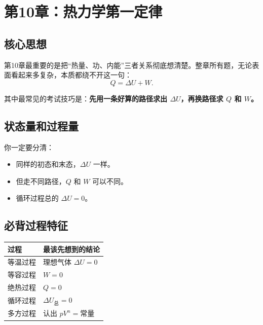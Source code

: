 \documentclass[12pt,a4paper]{article}
\newcommand{\key}[1]{\textcolor{blue!60!black}{\textbf{#1}}}
\begin{document}
\section{第10章：热力学第一定律}

\subsection{核心思想}

第10章最重要的是把“热量、功、内能”三者关系彻底想清楚。整章所有题，无论表面看起来多复杂，本质都绕不开这一句：
\[
Q=\Delta U + W.
\]

其中最常见的考试技巧是：\key{先用一条好算的路径求出 $\Delta U$，再换路径求 $Q$ 和 $W$。}

\subsection{状态量和过程量}

\begin{center}
\end{center}

你一定要分清：

\begin{itemize}
  \item 同样的初态和末态，$\Delta U$ 一样。
  \item 但走不同路径，$Q$ 和 $W$ 可以不同。
  \item 循环过程总的 $\Delta U = 0$。
\end{itemize}

\subsection{必背过程特征}

\begin{tabularx}{\textwidth}{>{\raggedright\arraybackslash}p{2.3cm} X}
\toprule
过程 & 最该先想到的结论 \\
\midrule
等温过程 & 理想气体 $\Delta U = 0$ \\
等容过程 & $W = 0$ \\
绝热过程 & $Q = 0$ \\
循环过程 & $\Delta U_{\text{总}} = 0$ \\
多方过程 & 认出 $pV^n=\text{常量}$ \\
\bottomrule
\end{tabularx}
\end{document}

